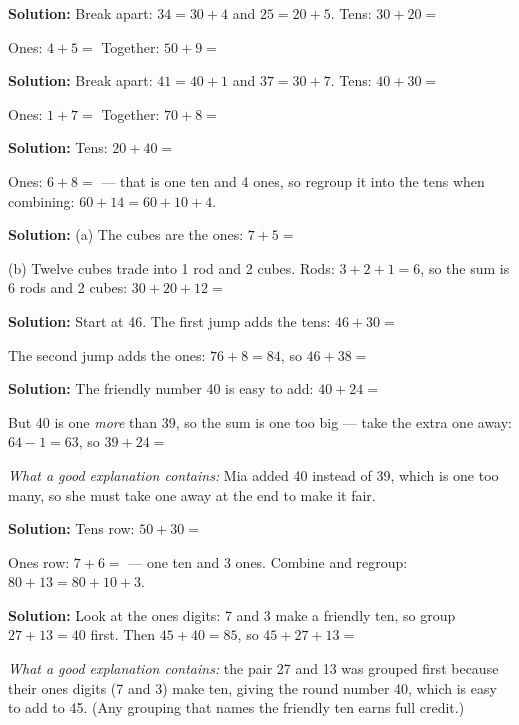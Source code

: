 \documentclass[12pt]{article}
\begin{document}



\textbf{Solution:} Break apart: $34 = 30 + 4$ and $25 = 20 + 5$.
Tens: $30 + 20 = {}$ 

Ones: $4 + 5 = {}$  \quad Together: $50 + 9 = {}$ 


\textbf{Solution:} Break apart: $41 = 40 + 1$ and $37 = 30 + 7$.
Tens: $40 + 30 = {}$ 

Ones: $1 + 7 = {}$  \quad Together: $70 + 8 = {}$ 


\textbf{Solution:} Tens: $20 + 40 = {}$ 

Ones: $6 + 8 = {}$  --- that is one ten and 4 ones, so regroup it
into the tens when combining: $60 + 14 = 60 + 10 + 4$. 


\textbf{Solution:} (a) The cubes are the ones: $7 + 5 = {}$ 

(b) Twelve cubes trade into 1 rod and 2 cubes. Rods: $3 + 2 + 1 = 6$, so the
sum is 6 rods and 2 cubes: $30 + 20 + 12 = {}$ 


\textbf{Solution:} Start at 46. The first jump adds the tens:
$46 + 30 = {}$ 

The second jump adds the ones: $76 + 8 = 84$, so $46 + 38 = {}$ 


\textbf{Solution:} The friendly number 40 is easy to add:
$40 + 24 = {}$ 

But 40 is one \emph{more} than 39, so the sum is one too big --- take the
extra one away: $64 - 1 = 63$, so $39 + 24 = {}$ 

\emph{What a good explanation contains:} Mia added 40 instead of 39, which is
one too many, so she must take one away at the end to make it fair.


\textbf{Solution:} Tens row: $50 + 30 = {}$ 

Ones row: $7 + 6 = {}$  --- one ten and 3 ones. Combine and regroup:
$80 + 13 = 80 + 10 + 3$. 


\textbf{Solution:} Look at the ones digits: 7 and 3 make a friendly ten, so
group $27 + 13 = 40$ first. Then $45 + 40 = 85$, so $45 + 27 + 13 = {}$ 

\emph{What a good explanation contains:} the pair 27 and 13 was grouped first
because their ones digits (7 and 3) make ten, giving the round number 40,
which is easy to add to 45. (Any grouping that names the friendly ten earns
full credit.)
\end{document}
